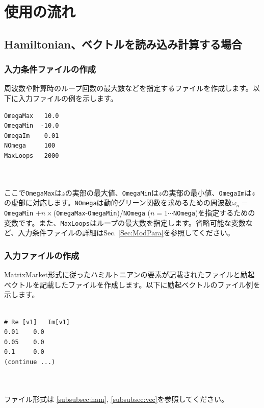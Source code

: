 \documentclass[12pt,titlepage]{jarticle}
\begin{document}
\newpage
\section{使用の流れ}\label{Sec:Usage}
\subsection{Hamiltonian、ベクトルを読み込み計算する場合}
\subsubsection*{入力条件ファイルの作成}
周波数や計算時のループ回数の最大数などを指定するファイルを作成します。以下に入力ファイルの例を示します。\\
\begin{minipage}{10cm}
\begin{screen}
\begin{verbatim}
OmegaMax   10.0
OmegaMin  -10.0
OmegaIm    0.01
NOmega     100  
MaxLoops   2000
\end{verbatim}
\end{screen}
\end{minipage}
\\ \\
ここで\verb|OmegaMax|は$z$の実部の最大値、\verb|OmegaMin|は$z$の実部の最小値、\verb|OmegaIm|は$z$の虚部に対応します。\verb|NOmega|は動的グリーン関数を求めるための周波数$\omega_n = $ \verb|OmegaMin| $+n\times$(\verb|OmegaMax|-\verb|OmegaMin|)/\verb|NOmega| ($n=1\cdots$\verb|NOmega|)を指定するための変数です。また、\verb|MaxLoops|はループの最大数を指定します。省略可能な変数など、入力条件ファイルの詳細はSec. \ref{Sec:ModPara}を参照してください。

\subsubsection*{入力ファイルの作成}
MatrixMarket形式に従ったハミルトニアンの要素が記載されたファイルと励起ベクトルを記載したファイルを作成します。以下に励起ベクトルのファイル例を示します。\\
\\
\begin{minipage}{10cm}
\begin{screen}
\begin{verbatim}
# Re [v1]   Im[v1]
0.01    0.0
0.05    0.0
0.1     0.0
(continue ...)
\end{verbatim}
\end{screen}
\end{minipage}
\\\\
ファイル形式は \ref{subsubsec:ham},  \ref{subsubsec:vec}を参照してください。\\
\end{document}
